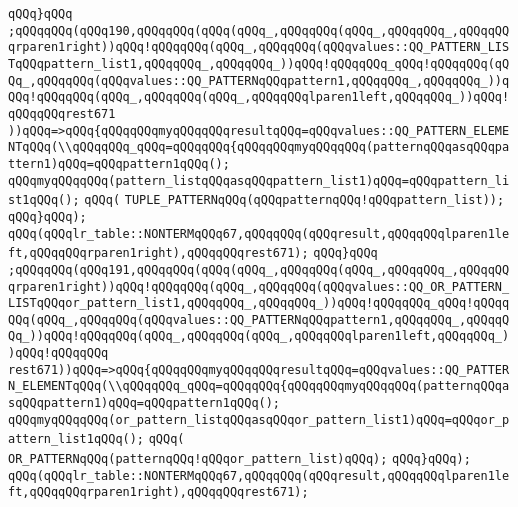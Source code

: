 \verb|qQQq}qQQq|\newline
\verb|;qQQqqQQq(qQQq190,qQQqqQQq(qQQq(qQQq_,qQQqqQQq(qQQq_,qQQqqQQq_,qQQqqQQqrparen1right))qQQq!qQQqqQQq(qQQq_,qQQqqQQq(qQQqvalues::QQ_PATTERN_LISTqQQqpattern_list1,qQQqqQQq_,qQQqqQQq_))qQQq!qQQqqQQq_qQQq!qQQqqQQq(qQQq_,qQQqqQQq(qQQqvalues::QQ_PATTERNqQQqpattern1,qQQqqQQq_,qQQqqQQq_))qQQq!qQQqqQQq(qQQq_,qQQqqQQq(qQQq_,qQQqqQQqlparen1left,qQQqqQQq_))qQQq!qQQqqQQqrest671|\newline
\verb|))qQQq=>qQQq{qQQqqQQqmyqQQqqQQqresultqQQq=qQQqvalues::QQ_PATTERN_ELEMENTqQQq(\\qQQqqQQq_qQQq=qQQqqQQq{qQQqqQQqmyqQQqqQQq(patternqQQqasqQQqpattern1)qQQq=qQQqpattern1qQQq();|\newline
\verb|qQQqmyqQQqqQQq(pattern_listqQQqasqQQqpattern_list1)qQQq=qQQqpattern_list1qQQq();|\newline
\verb|qQQq(|\newline
\verb|TUPLE_PATTERNqQQq(qQQqpatternqQQq!qQQqpattern_list));|\newline
\verb|qQQq}qQQq);|\newline
\verb|qQQq(qQQqlr_table::NONTERMqQQq67,qQQqqQQq(qQQqresult,qQQqqQQqlparen1left,qQQqqQQqrparen1right),qQQqqQQqrest671);|\newline
\verb|qQQq}qQQq|\newline
\verb|;qQQqqQQq(qQQq191,qQQqqQQq(qQQq(qQQq_,qQQqqQQq(qQQq_,qQQqqQQq_,qQQqqQQqrparen1right))qQQq!qQQqqQQq(qQQq_,qQQqqQQq(qQQqvalues::QQ_OR_PATTERN_LISTqQQqor_pattern_list1,qQQqqQQq_,qQQqqQQq_))qQQq!qQQqqQQq_qQQq!qQQqqQQq(qQQq_,qQQqqQQq(qQQqvalues::QQ_PATTERNqQQqpattern1,qQQqqQQq_,qQQqqQQq_))qQQq!qQQqqQQq(qQQq_,qQQqqQQq(qQQq_,qQQqqQQqlparen1left,qQQqqQQq_))qQQq!qQQqqQQq|\newline
\verb|rest671))qQQq=>qQQq{qQQqqQQqmyqQQqqQQqresultqQQq=qQQqvalues::QQ_PATTERN_ELEMENTqQQq(\\qQQqqQQq_qQQq=qQQqqQQq{qQQqqQQqmyqQQqqQQq(patternqQQqasqQQqpattern1)qQQq=qQQqpattern1qQQq();|\newline
\verb|qQQqmyqQQqqQQq(or_pattern_listqQQqasqQQqor_pattern_list1)qQQq=qQQqor_pattern_list1qQQq();|\newline
\verb|qQQq(|\newline
\verb|OR_PATTERNqQQq(patternqQQq!qQQqor_pattern_list)qQQq);|\newline
\verb|qQQq}qQQq);|\newline
\verb|qQQq(qQQqlr_table::NONTERMqQQq67,qQQqqQQq(qQQqresult,qQQqqQQqlparen1left,qQQqqQQqrparen1right),qQQqqQQqrest671);|\newline
